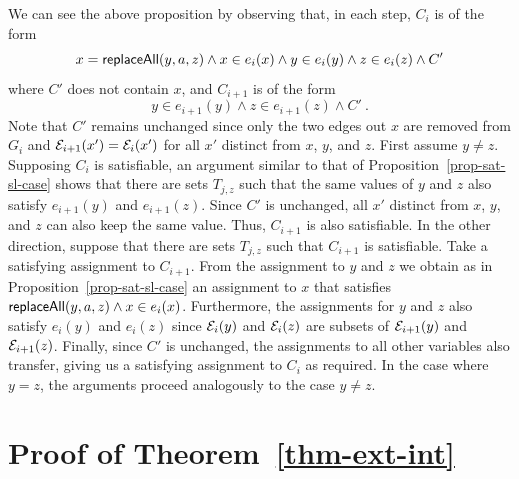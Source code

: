 We can see the above proposition by observing that, in each step, $C_i$ is of the form
\[
    x = \mathsf{replaceAll}(y, a, z) \wedge x \in e_i(x) \wedge y \in e_i(y) \wedge z \in e_i(z) \wedge C'
\]
where $C'$ does not contain $x$, and $C_{i+1}$ is of the form
\[
    y \in e_{i+1}(y) \wedge z \in e_{i+1}(z) \wedge C' \ .
\]
Note that $C'$ remains unchanged since only the two edges out $x$ are removed from $G_i$ and $\mathcal{E}_{i+1}(x') = \mathcal{E}_i(x')$ for all $x'$ distinct from $x$, $y$, and $z$.
First assume $y \neq z$.
Supposing $C_i$ is satisfiable, an argument similar to that of Proposition~\ref{prop-sat-sl-case} shows that there are sets $T_{j,z}$ such that the same values of $y$ and $z$ also satisfy $e_{i+1}(y)$ and $e_{i+1}(z)$.
Since $C'$ is unchanged, all $x'$ distinct from $x$, $y$, and $z$ can also keep the same value.
Thus, $C_{i+1}$ is also satisfiable.
In the other direction, suppose that there are sets $T_{j, z}$ such that $C_{i+1}$ is satisfiable. Take a satisfying assignment to $C_{i+1}$.
From the assignment to $y$ and $z$ we obtain as in Proposition~\ref{prop-sat-sl-case} an assignment to $x$ that satisfies $\mathsf{replaceAll}(y, a, z) \wedge x \in e_i(x)$.
Furthermore, the assignments for $y$ and $z$ also satisfy $e_i(y)$ and $e_i(z)$ since $\mathcal{E}_i(y)$ and $\mathcal{E}_i(z)$ are subsets of $\mathcal{E}_{i+1}(y)$ and $\mathcal{E}_{i+1}(z)$.
Finally, since $C'$ is unchanged, the assignments to all other variables also transfer, giving us a satisfying assignment to $C_i$ as required.
In the case where $y = z$, the arguments proceed analogously to the case $y \neq z$.



\section{Proof of Theorem~\ref{thm-ext-int}}

